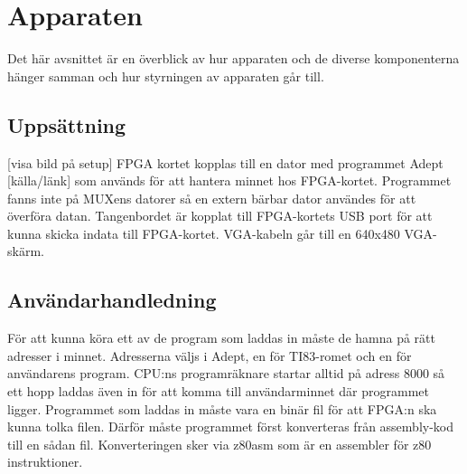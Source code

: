 \documentclass[main.tex]{subfiles}
\begin{document}
\section{Apparaten}
Det här avsnittet är en överblick av hur apparaten och de diverse komponenterna
hänger samman och hur styrningen av apparaten går till.
\subsection{Uppsättning}
[visa bild på setup] FPGA kortet kopplas till en dator med programmet Adept
[källa/länk] som används för att hantera minnet hos FPGA-kortet. Programmet
fanns inte på MUXens datorer så en extern bärbar dator användes för att
överföra datan. Tangenbordet är kopplat till FPGA-kortets USB port för att
kunna skicka indata till FPGA-kortet. VGA-kabeln går till en 640x480 VGA-skärm.

\subsection{Användarhandledning}
För att kunna köra ett av de program som laddas in måste de hamna på rätt
adresser i minnet. Adresserna väljs i Adept, en för TI83-romet och en för
användarens program. CPU:ns programräknare startar alltid på adress 8000 så ett
hopp laddas även in för att komma till användarminnet där programmet ligger.
Programmet som laddas in måste vara en binär fil för att FPGA:n ska kunna tolka
filen. Därför måste programmet först konverteras från assembly-kod till en
sådan fil. Konverteringen sker via z80asm som är en assembler för z80
instruktioner.

\clearpage
\end{document}
